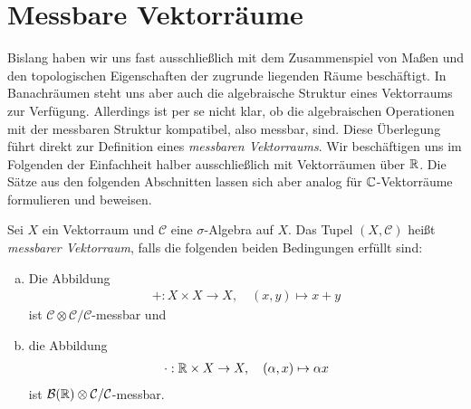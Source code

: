 \section{Messbare Vektorräume}
Bislang haben wir uns fast ausschließlich mit dem Zusammenspiel von Maßen und den topologischen Eigenschaften der zugrunde liegenden Räume beschäftigt.
In Banachräumen steht uns aber auch die algebraische Struktur eines Vektorraums zur Verfügung. Allerdings ist per se nicht klar, ob die algebraischen Operationen mit der messbaren Struktur kompatibel, also messbar, sind. 
Diese Überlegung führt direkt zur Definition eines \textit{messbaren Vektorraums}. Wir beschäftigen uns im Folgenden der Einfachheit halber ausschließlich mit Vektorräumen über $\mathbb{R}$. 
Die Sätze aus den folgenden Abschnitten lassen sich aber analog für $\mathbb{C}$-Vektorräume formulieren und beweisen. 

\begin{mydef}
    Sei $X$ ein Vektorraum und $\mathcal{C}$ eine $\sigma$-Algebra auf $X$. Das Tupel $(X, \mathcal{C})$ heißt \textit{messbarer Vektorraum}, falls die folgenden beiden Bedingungen erfüllt sind: 
    \begin{enumerate}[(a)]
        \item Die Abbildung 
        \begin{align*}
            + : X \times X \to X, \quad (x,y) \mapsto x + y
        \end{align*}
        ist $\mathcal{C}\otimes \mathcal{C}/\mathcal{C}$-messbar und
        \item die Abbildung 
        \begin{align*}
            \cdot : \mathbb{R} \times X \to X, \quad  (\alpha, x) \mapsto \alpha x
        \end{align*}
        ist $\mathcal{B}(\mathbb{R}) \otimes \mathcal{C}/\mathcal{C}$-messbar. 
    \end{enumerate}
\end{mydef}

